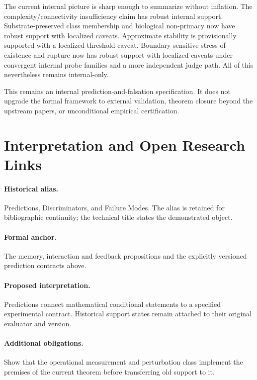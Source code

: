 \documentclass[11pt,a4paper]{article}
\begin{document}
The current internal picture is sharp enough to summarize without inflation. The complexity/connectivity insufficiency claim has robust internal support. Substrate-preserved class membership and biological non-primacy now have robust support with localized caveats. Approximate stability is provisionally supported with a localized threshold caveat. Boundary-sensitive stress of existence and rupture now has robust support with localized caveats under convergent internal probe families and a more independent judge path. All of this nevertheless remains internal-only.

This remains an internal prediction-and-falsation specification. It does not upgrade the formal framework to external validation, theorem closure beyond the upstream papers, or unconditional empirical certification.

\section{Interpretation and Open Research Links}\label{sec:interpretation-open-links}
\paragraph{Historical alias.} Predictions, Discriminators, and Failure Modes. The alias is retained for bibliographic continuity; the technical title states the demonstrated object.

\paragraph{Formal anchor.} The memory, interaction and feedback propositions and the explicitly versioned prediction contracts above.

\paragraph{Proposed interpretation.} Predictions connect mathematical conditional statements to a specified experimental contract. Historical support states remain attached to their original evaluator and version.

\paragraph{Additional obligations.} Show that the operational measurement and perturbation class implement the premises of the current theorem before transferring old support to it.
\end{document}
